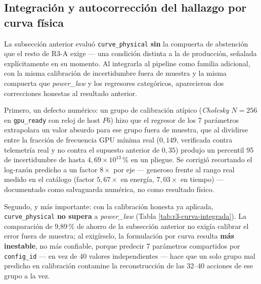 \documentclass[12pt,oneside,spanish]{book}
\begin{document}
\subsection{Integración y autocorrección del hallazgo por curva física}
\label{sec:resultados-r3-curva-integracion}

La subsección anterior evaluó \texttt{curve\_physical} \textbf{sin} la compuerta de abstención que el resto de R3-A exige --- una condición distinta a la de producción, señalada explícitamente en su momento. Al integrarla al pipeline como familia adicional, con la misma calibración de incertidumbre fuera de muestra y la misma compuerta que \textit{power\_law} y los regresores categóricos, aparecieron dos correcciones honestas al resultado anterior.

Primero, un defecto numérico: un grupo de calibración atípico (\textit{Cholesky} $N=256$ en \texttt{gpu\_ready} con reloj de host $F6$) hizo que el regresor de los 7 parámetros extrapolara un valor absurdo para ese grupo fuera de muestra, que al dividirse entre la fracción de frecuencia GPU mínima real ($0{,}149$, verificada contra telemetría real y no contra el supuesto anterior de $0{,}35$) produjo un percentil 95 de incertidumbre de hasta $4{,}69\times10^{13}$\,\% en un pliegue. Se corrigió recortando el log-razón predicho a un factor $8\times$ por eje --- generoso frente al rango real medido en el catálogo (factor $5{,}67\times$ en energía, $7{,}03\times$ en tiempo) --- documentado como salvaguarda numérica, no como resultado físico.

Segundo, y más importante: con la calibración honesta ya aplicada, \texttt{curve\_physical} \textbf{no supera} a \textit{power\_law} (Tabla \ref{tab:r3-curva-integrada}). La comparación de 9,89\,\% de ahorro de la subsección anterior no exigía calibrar el error fuera de muestra; al exigírselo, la formulación por curva resulta \textbf{más inestable}, no más confiable, porque predecir 7 parámetros compartidos por \texttt{config\_id} --- en vez de 40 valores independientes --- hace que un solo grupo mal predicho en calibración contamine la reconstrucción de las 32--40 acciones de ese grupo a la vez.
\end{document}
